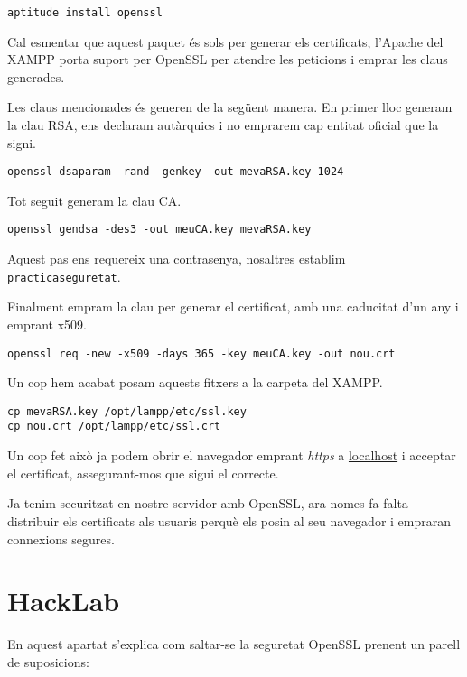 \documentclass[a4paper,11pt]{scrartcl}
\begin{document}
\begin{verbatim}
aptitude install openssl
\end{verbatim}

Cal esmentar que aquest paquet és sols per generar els certificats, l'Apache del XAMPP
porta suport per OpenSSL per atendre les peticions i emprar les claus generades.

Les claus mencionades és generen de la següent manera.
En primer lloc generam la clau RSA, ens declaram autàrquics i no emprarem cap entitat
oficial que la signi.

\begin{verbatim}
openssl dsaparam -rand -genkey -out mevaRSA.key 1024
\end{verbatim}

Tot seguit generam la clau CA.

\begin{verbatim}
openssl gendsa -des3 -out meuCA.key mevaRSA.key
\end{verbatim}

Aquest pas ens requereix una contrasenya, nosaltres establim \texttt{practicaseguretat}.

Finalment empram la clau per generar el certificat, amb una caducitat d'un any i emprant
x509.

\begin{verbatim}
openssl req -new -x509 -days 365 -key meuCA.key -out nou.crt
\end{verbatim}

Un cop hem acabat posam aquests fitxers a la carpeta del XAMPP.

\begin{verbatim}
cp mevaRSA.key /opt/lampp/etc/ssl.key
cp nou.crt /opt/lampp/etc/ssl.crt
\end{verbatim}

Un cop fet això ja podem obrir el navegador emprant \emph{https} a \href{https://localhost}{localhost}
i acceptar el certificat, assegurant-mos que sigui el correcte.

Ja tenim securitzat en nostre servidor amb OpenSSL, ara nomes fa falta distribuir
els certificats als usuaris perquè els posin al seu navegador i empraran connexions segures.

\section{HackLab}
En aquest apartat s'explica com saltar-se la seguretat OpenSSL prenent un parell de suposicions:
\end{document}
